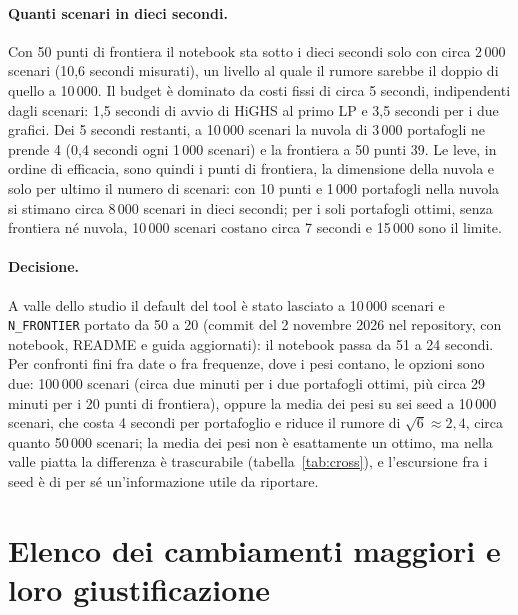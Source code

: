 \documentclass[11pt,a4paper]{article}
\newcommand{\nbTenFifty}{51}
\newcommand{\nbTenTwenty}{24}
\newcommand{\nbHundredTwenty}{circa 29 minuti}
\begin{document}
\paragraph{Quanti scenari in dieci secondi.} Con 50 punti di frontiera il notebook sta sotto i dieci secondi solo con circa 2\,000 scenari (10,6 secondi misurati), un livello al quale il rumore sarebbe il doppio di quello a 10\,000. Il budget \`e dominato da costi fissi di circa 5 secondi, indipendenti dagli scenari: 1,5 secondi di avvio di HiGHS al primo LP e 3,5 secondi per i due grafici. Dei 5 secondi restanti, a 10\,000 scenari la nuvola di 3\,000 portafogli ne prende 4 (0,4 secondi ogni 1\,000 scenari) e la frontiera a 50 punti 39. Le leve, in ordine di efficacia, sono quindi i punti di frontiera, la dimensione della nuvola e solo per ultimo il numero di scenari: con 10 punti e 1\,000 portafogli nella nuvola si stimano circa 8\,000 scenari in dieci secondi; per i soli portafogli ottimi, senza frontiera n\'e nuvola, 10\,000 scenari costano circa 7 secondi e 15\,000 sono il limite.

\paragraph{Decisione.} A valle dello studio il default del tool \`e stato lasciato a 10\,000 scenari e \texttt{N\_FRONTIER} portato da 50 a 20 (commit del 2 novembre 2026 nel repository, con notebook, README e guida aggiornati): il notebook passa da \nbTenFifty{} a \nbTenTwenty{} secondi. Per confronti fini fra date o fra frequenze, dove i pesi contano, le opzioni sono due: 100\,000 scenari (circa due minuti per i due portafogli ottimi, pi\`u \nbHundredTwenty{} per i 20 punti di frontiera), oppure la media dei pesi su sei seed a 10\,000 scenari, che costa 4 secondi per portafoglio e riduce il rumore di $\sqrt{6} \approx 2{,}4$, circa quanto 50\,000 scenari; la media dei pesi non \`e esattamente un ottimo, ma nella valle piatta la differenza \`e trascurabile (tabella~\ref{tab:cross}), e l'escursione fra i seed \`e di per s\'e un'informazione utile da riportare.

\section{Elenco dei cambiamenti maggiori e loro giustificazione}
\end{document}

